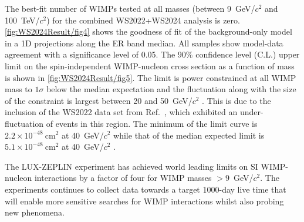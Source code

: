 The best-fit number of WIMPs tested at all masses (between 9~GeV/$c^2$ and 100~TeV/$c^2$) for the combined WS2022+WS2024 analysis is zero. \autoref{fig:WS2024Result/fig4} shows the goodness of fit of the background-only model in a 1D projections along the ER band median. All samples show model-data agreement with a significance level of 0.05. The 90\% confidence level (C.L.) upper limit on the spin-independent WIMP-nucleon cross section as a function of mass is shown in \autoref{fig:WS2024Result/fig5}. The limit is power constrained at all WIMP mass to $1\sigma$ below the median expectation and the fluctuation along with the size of the constraint is largest between 20 and 50~GeV/$c^2$ \cite{LZCollaboration:2024lux}. This is due to the inclusion of the WS2022 data set from Ref.~\cite{LZ:2022lsv}, which exhibited an under-fluctuation of events in this region. The minimum of the limit curve is $2.2\times10^{-48}~\text{cm}^2$ at 40~GeV/$c^2$ while that of the median expected limit is $5.1\times10^{-48}~\text{cm}^2$ at 40~GeV/$c^2$ \cite{LZCollaboration:2024lux}.


The LUX-ZEPLIN experiment has achieved world leading limits on SI WIMP-nucleon interactions by a factor of four for WIMP masses $>9$~GeV/$c^2$. The experiments continues to collect data towards a target 1000-day live time that will enable more sensitive searches for WIMP interactions whilst also probing new phenomena.

